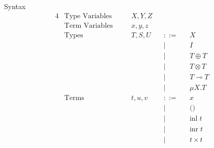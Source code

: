\documentclass[10pt]{jsarticle}
\newcommand{\bnfdef}{::=}
\begin{document}
\begin{itembox}[c]{Syntax}
  \begin{alignat*}{4}
    &\text{Type Variables}  & \quad &X,Y,Z           &       &        &       & \\
    &\text{Term Variables}  &       &x,y,z           &       &        &       & \\
    &\text{Types}           &       &T,S,U           &       &\bnfdef &       & X \\
    &                       &       &                &       &|       &       & I \\
    &                       &       &                &       &|       &       & T \oplus T \\
    &                       &       &                &       &|       &       & T \otimes T \\
    &                       &       &                &       &|       &       & T \multimap T \\
    &                       &       &                &       &|       &       & \mu{X}.T \\
    &\text{Terms}           &       &t,u,v           &       &\bnfdef &       & x \\
    &                       &       &                &       &|       &       & \text{()} \\
    &                       &       &                &       &|       &       & \text{inl}\;t \\
    &                       &       &                &       &|       &       & \text{inr}\;t \\
    &                       &       &                &       &|       &       & t\times{}t \\

\end{alignat*}
\end{itembox}
\end{document}
